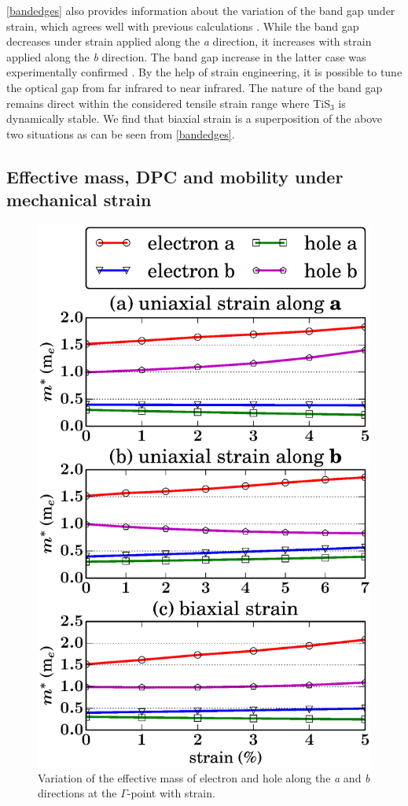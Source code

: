 \autoref{bandedges} also provides information about the variation of the band gap under strain, which agrees well with previous calculations \cite{Biele2015,Li2015}. While the band gap decreases under strain applied along the \textit{a} direction, it increases with strain applied  along the \textit{b} direction. The band gap increase in the latter case was experimentally confirmed \cite{Biele2015}.  By the help of  strain engineering, it is possible to tune the optical gap from far infrared to near infrared. The nature of the band gap remains direct within the considered tensile strain range where TiS$_3$ is dynamically stable. We find that  biaxial strain is a superposition of the above two situations as can be seen from \autoref{bandedges}. 

\subsection{Effective mass, DPC and mobility under  mechanical strain}

\begin{figure}[htb]
\centering
\includegraphics[width=0.6\linewidth]{Mob_emass.eps}
\caption{Variation of the effective mass of electron and hole along the \textit{a} and \textit{b} directions at the $\Gamma$-point with strain. \label{emass}}	
\end{figure} 


